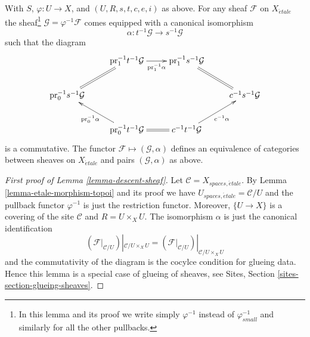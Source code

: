 \begin{lemma}
\label{lemma-descent-sheaf}
With $S$, $\varphi : U \to X$, and $(U, R, s, t, c, e, i)$ as above.
For any sheaf $\mathcal{F}$ on $X_{\acute{e}tale}$ the
sheaf\footnote{In this lemma
and its proof we write simply $\varphi^{-1}$ instead of $\varphi_{small}^{-1}$
and similarly for all the other pullbacks.}
$\mathcal{G} = \varphi^{-1}\mathcal{F}$ comes equipped with a canonical
isomorphism
$$
\alpha :
t^{-1}\mathcal{G}
\longrightarrow
s^{-1}\mathcal{G}
$$
such that the diagram
$$
\xymatrix{
& \text{pr}_1^{-1}t^{-1}\mathcal{G} \ar[r]_-{\text{pr}_1^{-1}\alpha} &
\text{pr}_1^{-1}s^{-1}\mathcal{G} \ar@{=}[rd] & \\
\text{pr}_0^{-1}s^{-1}\mathcal{G} \ar@{=}[ru] & & &
c^{-1}s^{-1}\mathcal{G} \\
&
\text{pr}_0^{-1}t^{-1}\mathcal{G} \ar[lu]^{\text{pr}_0^{-1}\alpha} \ar@{=}[r] &
c^{-1}t^{-1}\mathcal{G} \ar[ru]_{c^{-1}\alpha}
}
$$
is a commutative. The functor $\mathcal{F} \mapsto (\mathcal{G}, \alpha)$
defines an equivalence of categories between sheaves on
$X_{\acute{e}tale}$ and pairs $(\mathcal{G}, \alpha)$ as above.
\end{lemma}

\begin{proof}[First proof of Lemma \ref{lemma-descent-sheaf}]
Let $\mathcal{C} = X_{spaces, \acute{e}tale}$. By
Lemma \ref{lemma-etale-morphism-topoi}
and its proof we have $U_{spaces, \acute{e}tale} = \mathcal{C}/U$
and the pullback functor $\varphi^{-1}$ is just the restriction functor.
Moreover, $\{U \to X\}$ is a covering of the site $\mathcal{C}$ and
$R = U \times_X U$. The isomorphism $\alpha$ is just the canonical
identification
$$
\left(\mathcal{F}|_{\mathcal{C}/U}\right)|_{\mathcal{C}/U \times_X U}
=
\left(\mathcal{F}|_{\mathcal{C}/U}\right)|_{\mathcal{C}/U \times_X U}
$$
and the commutativity of the diagram is the cocylce condition for glueing
data. Hence this lemma is a special case of glueing of sheaves, see
Sites, Section \ref{sites-section-glueing-sheaves}.
\end{proof}

